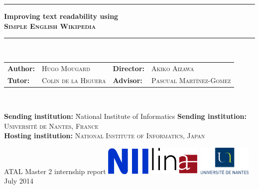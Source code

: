 \documentclass[a4paper, 11pt, onepage]{scrreprt}
\newcommand\sew{\textsc{Simple English Wikipedia}}
\begin{document}
\begin{titlepage}
  \begin{center}
    \noindent\rule{\textwidth}{0.4pt}
    {\huge\bfseries Improving text readability using\\
      \sew\\}
    \noindent\rule{\textwidth}{0.4pt}\\
    \vspace{1.5cm}
    {\large
    \begin{tabularx}{\textwidth}{lXll}
      \textbf{Author:} & \textsc{Hugo Mougard} &
      \textbf{Director:} & \textsc{Akiko Aizawa} \\
      \textbf{Tutor:} & \textsc{Colin de la Higuera} &
      \textbf{Advisor:} & \textsc{Pascual Martínez-Gomez} \\
    \end{tabularx}}\\[5pt]
    \vfill
    \parbox{0pt}{\large \begin{tabbing}
        \textbf{Sending institution:} \= National Institute of Informatics \kill
        \textbf{Sending institution:} \> \textsc{Université de Nantes, France} \\
        \textbf{Hosting institution:} \> \textsc{National Institute of
        Informatics, Japan} \\
      \end{tabbing}}
    \vfill
    {\LARGE ATAL Master 2 internship report}
    \vfill
    \includegraphics[width=0.16\textwidth]{img/nii.png}
    \hfill
    \hfill
    \includegraphics[width=0.19\textwidth]{img/lina.png}
    \hfill
    \includegraphics[width=0.19\textwidth]{img/univ.eps}
    \vfill
    {July 2014}
  \end{center}
\end{titlepage}
\end{document}
